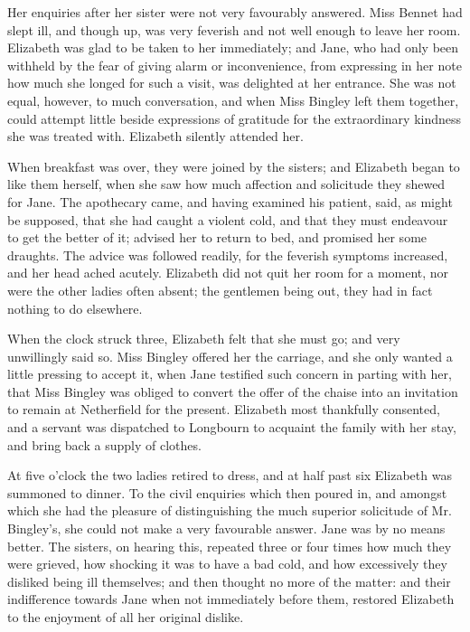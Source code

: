 Her enquiries after her sister were not very favourably
answered. Miss Bennet had slept ill, and though up,
was very feverish and not well enough to leave her room.
Elizabeth was glad to be taken to her immediately; and
Jane, who had only been withheld by the fear of giving
alarm or inconvenience, from expressing in her note how
much she longed for such a visit, was delighted at her
entrance. She was not equal, however, to much conversation,
and when Miss Bingley left them together,
could attempt little beside expressions of gratitude for
the extraordinary kindness she was treated with. Elizabeth
silently attended her.

When breakfast was over, they were joined by the
sisters; and Elizabeth began to like them herself, when
she saw how much affection and solicitude they shewed
for Jane. The apothecary came, and having examined
his patient, said, as might be supposed, that she had
caught a violent cold, and that they must endeavour to
get the better of it; advised her to return to bed, and
promised her some draughts. The advice was followed
readily, for the feverish symptoms increased, and her
head ached acutely. Elizabeth did not quit her room
for a moment, nor were the other ladies often absent;
the gentlemen being out, they had in fact nothing to do
elsewhere.

When the clock struck three, Elizabeth felt that she
must go; and very unwillingly said so. Miss Bingley
offered her the carriage, and she only wanted a little
pressing to accept it, when Jane testified such concern
in parting with her, that Miss Bingley was obliged to
convert the offer of the chaise into an invitation to remain
at Netherfield for the present. Elizabeth most thankfully
consented, and a servant was dispatched to Longbourn
to acquaint the family with her stay, and bring back
a supply of clothes.


At five o’clock the two ladies retired to dress, and
at half past six Elizabeth was summoned to dinner. To
the civil enquiries which then poured in, and amongst
which she had the pleasure of distinguishing the much
superior solicitude of Mr. Bingley’s, she could not make
a very favourable answer. Jane was by no means better.
The sisters, on hearing this, repeated three or four times
how much they were grieved, how shocking it was to have
a bad cold, and how excessively they disliked being ill
themselves; and then thought no more of the matter:
and their indifference towards Jane when not immediately
before them, restored Elizabeth to the enjoyment of all
her original dislike.

